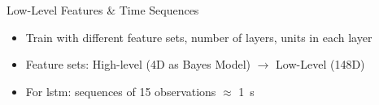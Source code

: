 \begin{frame}{Low-Level Features \& Time Sequences}
      \centering
      \vspace{20pt}
        \begin{itemize}[label=-]
          \item<2-> Train with different feature sets, number of layers, units in each layer
          \item<3-> Feature sets: High-level (4D as Bayes Model) \(\rightarrow\) Low-Level (148D)
          \item<4-> For lstm: sequences of 15 observations \(\approx\) \SI{1}{\second}
        \end{itemize}
\end{frame}

